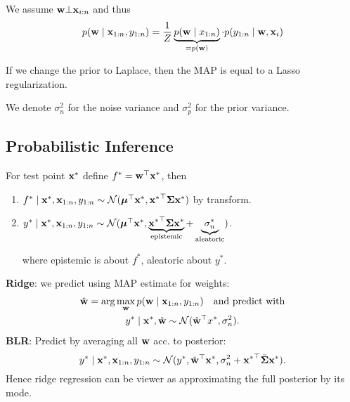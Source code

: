 \begin{note*}
    We assume \(\vb{w} \bot \vb{x}_{i:n}\) and thus
    \[p(\vb{w} \mid \vb{x}_{1:n}, y_{1:n}) = \frac{1}{Z} \underbrace{p(\vb{w} \mid x_{1:n})}_{= p(\vb{w})} \cdot p(y_{1:n} \mid \vb{w}, \vb{x}_i)\]
\end{note*}

\begin{corollary}
    If we change the prior to Laplace, then the MAP is equal to a Lasso regularization.
\end{corollary}

\begin{note*}[Noises]
    We denote \(\sigma_n^2\) for the noise variance and \(\sigma_p^2\) for the prior variance.
\end{note*}


\subsection{Probabilistic Inference}

For test point \(\vb{x}^*\) define \(f^* = \vb{w}^\top \vb{x}^*\), then
\begin{enumerate}
    \item \(f^* \mid \vb{x}^*, \vb{x}_{1:n}, y_{1:n} \sim \operatorname{\mathcal{N}}(\vb*{\mu}^\top\vb{x}^*, {\vb{x}^*}^\top \vb*{\Sigma}\vb{x}^*)\) by transform.
    \item \(y^* \mid \vb{x}^*, \vb{x}_{1:n}, y_{1:n} \sim \operatorname{\mathcal{N}}(\vb*{\mu}^\top\vb{x}^*, \underbrace{{\vb{x}^*}^\top \vb*{\Sigma}\vb{x}^*}_{\text{epistemic}} + \underbrace{\sigma_n^*}_{\text{aleatoric}})\).

    where epistemic is about \(f^*\), aleatoric about \(y^*\).
\end{enumerate}

\begin{theorem*}
    \textbf{Ridge}: we predict using MAP estimate for weights:
    \begin{gather*}
       \hat{\vb{w}} = \arg\max_{\vb{w}} p(\vb{w}\mid\vb{x}_{1:n}, y_{1:n}) \quad \text{and predict with} \\
       y^* \mid \vb{x}^*, \hat{\vb{w}} \sim \operatorname{\mathcal{N}}(\hat{\vb{w}}^\top x^*, \sigma_n^2).
    \end{gather*}
    \textbf{BLR}: Predict by averaging all \(\vb{w}\) acc. to posterior:
    \[y^* \mid \vb{x}^*, \vb{x}_{1:n}, y_{1:n} \sim \operatorname{\mathcal{N}}(y^*, \hat{\vb{w}}^\top \vb{x}^*, \sigma_n^2 + {\vb{x}^*}^\top \bar{\vb*{\Sigma}}\vb{x}^*).\]
    Hence ridge regression can be viewer as approximating the full posterior by its mode.
\end{theorem*}


